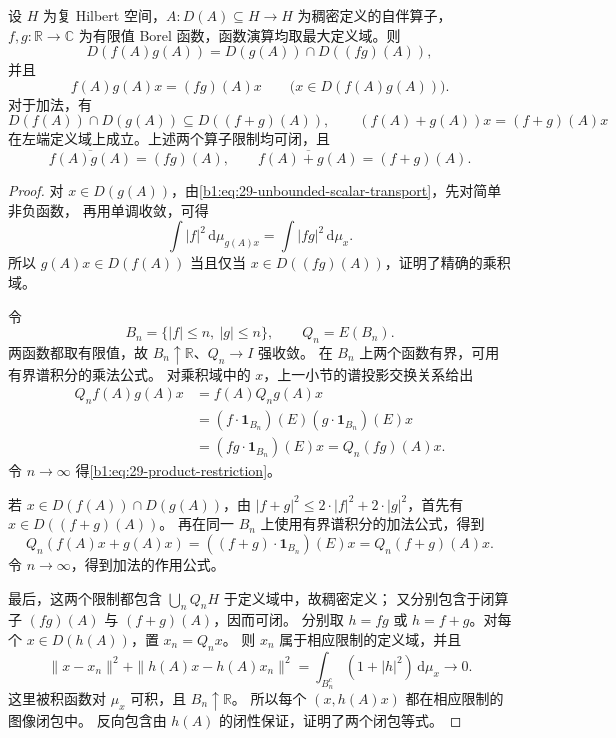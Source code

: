 \begin{proposition}[乘积和加法的定义域]
\label{b1:prop:29-unbounded-calculus-products}
设 \(H\) 为复 Hilbert 空间，\(A:D(A)\subseteq H\to H\) 为稠密定义的自伴算子，
\(f,g:\mathbb R\to\mathbb C\) 为有限值 Borel 函数，函数演算均取最大定义域。则
\begin{equation}\label{b1:eq:29-product-domain}
 D(f(A)g(A))=D(g(A))\cap D((fg)(A)),
\end{equation}
并且
\begin{equation}\label{b1:eq:29-product-restriction}
 f(A)g(A)x=(fg)(A)x
 \qquad\bigl(x\in D(f(A)g(A))\bigr).
\end{equation}
对于加法，有
\begin{equation}\label{b1:eq:29-sum-restriction}
 D(f(A))\cap D(g(A))\subseteq D((f+g)(A)),\qquad
 (f(A)+g(A))x=(f+g)(A)x
\end{equation}
在左端定义域上成立。上述两个算子限制均可闭，且
\begin{equation}\label{b1:eq:29-product-sum-closures}
 \overline{f(A)g(A)}=(fg)(A),\qquad
 \overline{f(A)+g(A)}=(f+g)(A).
\end{equation}
\end{proposition}
\begin{proof}
对 \(x\in D(g(A))\)，由\eqref{b1:eq:29-unbounded-scalar-transport}，先对简单非负函数，
再用单调收敛，可得
\[
 \int|f|^2\,\mathrm d\mu_{g(A)x}
 =\int|fg|^2\,\mathrm d\mu_x.
\]
所以 \(g(A)x\in D(f(A))\) 当且仅当 \(x\in D((fg)(A))\)，证明了精确的乘积域。

令
\[
 B_n=\{|f|\le n,\ |g|\le n\},\qquad Q_n=E(B_n).
\]
两函数都取有限值，故 \(B_n\uparrow\mathbb R\)、\(Q_n\to I\) 强收敛。
在 \(B_n\) 上两个函数有界，可用有界谱积分的乘法公式。
对乘积域中的 \(x\)，上一小节的谱投影交换关系给出
\[
 \begin{aligned}
 Q_nf(A)g(A)x
 &=f(A)Q_ng(A)x\\
 &=(f\cdot\mathbf1_{B_n})(E)(g\cdot\mathbf1_{B_n})(E)x\\
 &=(fg\cdot\mathbf1_{B_n})(E)x
 =Q_n(fg)(A)x.
 \end{aligned}
\]
令 \(n\to\infty\) 得\eqref{b1:eq:29-product-restriction}。

若 \(x\in D(f(A))\cap D(g(A))\)，由
\(|f+g|^2\le2\cdot|f|^2+2\cdot|g|^2\)，首先有 \(x\in D((f+g)(A))\)。
再在同一 \(B_n\) 上使用有界谱积分的加法公式，得到
\[
 Q_n(f(A)x+g(A)x)
 =((f+g)\cdot\mathbf1_{B_n})(E)x
 =Q_n(f+g)(A)x.
\]
令 \(n\to\infty\)，得到加法的作用公式。

最后，这两个限制都包含 \(\bigcup_nQ_nH\) 于定义域中，故稠密定义；
又分别包含于闭算子 \((fg)(A)\) 与 \((f+g)(A)\)，因而可闭。
分别取 \(h=fg\) 或 \(h=f+g\)。对每个 \(x\in D(h(A))\)，置 \(x_n=Q_nx\)。
则 \(x_n\) 属于相应限制的定义域，并且
\[
 \|x-x_n\|^2+\|h(A)x-h(A)x_n\|^2
 =\int_{B_n^c}(1+|h|^2)\,\mathrm d\mu_x\longrightarrow0.
\]
这里被积函数对 \(\mu_x\) 可积，且 \(B_n\uparrow\mathbb R\)。
所以每个 \((x,h(A)x)\) 都在相应限制的图像闭包中。
反向包含由 \(h(A)\) 的闭性保证，证明了两个闭包等式。
\end{proof}

